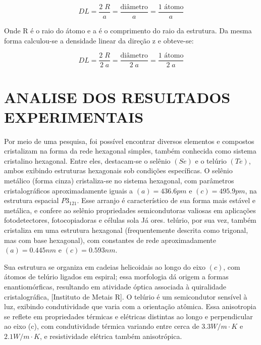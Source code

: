 \documentclass[10pt,twocolumn,letterpaper]{article}
\begin{document}
\begin{equation*}
    DL = \frac{2\;R}{a} = \frac{\text{diâmetro}}{a} = \frac{\text{1 átomo}}{a}
\end{equation*}

\hspace{1cm} Onde R é o raio do átomo e a é o comprimento do raio da estrutura. Da mesma forma calculou-se a densidade linear da direção z e obteve-se:

\begin{equation*}
    DL = \frac{2\;R}{2\;a} = \frac{\text{diâmetro}}{2\;a} = \frac{\text{1 átomo}}{2\;a}
\end{equation*}


\section{ANALISE DOS RESULTADOS EXPERIMENTAIS}

\hspace{1cm} Por meio de uma pesquisa, foi possível  encontrar diversos elementos e compostos cristalizam na forma da rede hexagonal simples, também conhecida como sistema cristalino hexagonal. Entre eles, destacam-se o selênio $(Se)$ e o telúrio $(Te)$, ambos exibindo estruturas hexagonais sob condições específicas. O selênio metálico (forma cinza) cristaliza-se no sistema hexagonal, com parâmetros cristalográficos aproximadamente iguais a $(a) = 436.6 pm$ e $(c) = 495.9 pm$, na estrutura espacial $P3_121$. Esse arranjo é característico de sua forma mais estável e metálica, e confere ao selênio propriedades semicondutoras valiosas em aplicações fotodetectores, fotocopiadoras e células sola Já ores. telúrio, por sua vez, também cristaliza em uma estrutura hexagonal (frequentemente descrita como trigonal, mas com base hexagonal), com constantes de rede aproximadamente $(a) = 0.445 nm$ e $(c) = 0.593 nm$.

\hspace{1cm} Sua estrutura se organiza em cadeias helicoidais ao longo do eixo $(c)$, com átomos de telúrio ligados em espiral; essa morfologia dá origem a formas enantiomórficas, resultando em atividade óptica associada à quiralidade cristalográfica, [Instituto de Metais R]. O telúrio é um semicondutor sensível à luz, exibindo condutividade que varia com a orientação atômica. Essa anisotropia se reflete em propriedades térmicas e elétricas distintas ao longo e perpendicular ao eixo (c), com condutividade térmica variando entre cerca de $3.3 W/m\cdot K$ e $2.1 W/m\cdot K$, e resistividade elétrica também anisotrópica. 
\end{document}
